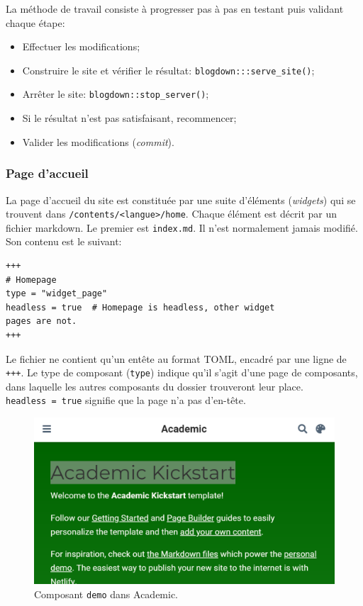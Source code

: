 \documentclass[
  12pt,
  french,
  a4paper,
  extrafontsizes,onecolumn,openright
  ]{memoir}
\providecommand{\tightlist}{%
  \setlength{\itemsep}{0pt}\setlength{\parskip}{0pt}}
\begin{document}
La méthode de travail consiste à progresser pas à pas en testant puis validant chaque étape:

\begin{itemize}
\tightlist
\item
  Effectuer les modifications;
\item
  Construire le site et vérifier le résultat: \texttt{blogdown:::serve\_site()};
\item
  Arrêter le site: \texttt{blogdown::stop\_server()};
\item
  Si le résultat n'est pas satisfaisant, recommencer;
\item
  Valider les modifications (\emph{commit}).
\end{itemize}

\hypertarget{page-daccueil}{%
\subsubsection{Page d'accueil}\label{page-daccueil}}

La page d'accueil du site est constituée par une suite d'éléments (\emph{widgets}) qui se trouvent dans \texttt{/contents/\textless{}langue\textgreater{}/home}.
Chaque élément est décrit par un fichier markdown.
Le premier est \texttt{index.md}.
Il n'est normalement jamais modifié.
Son contenu est le suivant:

\begin{verbatim}
+++
# Homepage
type = "widget_page"
headless = true  # Homepage is headless, other widget 
pages are not.
+++
\end{verbatim}

Le fichier ne contient qu'un entête au format TOML, encadré par une ligne de \texttt{+++}.
Le type de composant (\texttt{type}) indique qu'il s'agit d'une page de composants, dans laquelle les autres composants du dossier trouveront leur place.
\texttt{headless\ =\ true} signifie que la page n'a pas d'en-tête.



\scriptsize

\begin{figure}

{\centering \includegraphics[width=0.8\linewidth]{images/rediger-demo} 

}

\caption{Composant \texttt{demo} dans Academic.}\label{fig:rediger-demo}
\end{figure}
\end{document}
